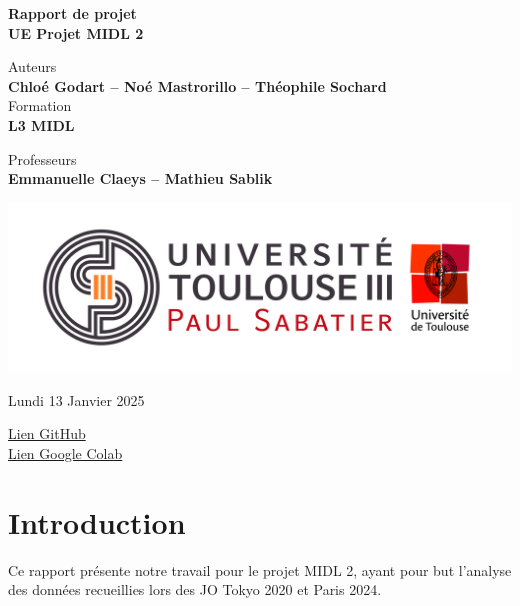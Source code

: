 \documentclass{article}
\begin{document}
\begin{titlepage}
\begin{center}

\vspace*{2cm}

\Huge \textbf{Rapport de projet}\\
\vspace{0.5cm}
\Large \textbf{UE Projet MIDL 2}\\

\vspace{1cm}

\large Auteurs \\ \textbf{Chloé Godart -- Noé Mastrorillo -- Théophile Sochard}\\
\vspace{0.5cm}
Formation \\ \textbf{L3 MIDL}


\vspace{1cm}


\large Professeurs \\ \textbf{Emmanuelle Claeys -- Mathieu Sablik}

\vspace{1cm}

\includegraphics[width=0.5\linewidth]{assets/Logo_UT3.jpg}


\vspace{1cm}

Lundi 13 Janvier 2025

\vspace{1cm}

\href{https://github.com/theosoch/projet-midl-2.git}{Lien GitHub}
 \\
\href{https://colab.research.google.com/drive/1JksiwP0xOu8adagP3vgTN8qdQLHjGTxZ?usp=drive_link}{Lien Google Colab}


\end{center}
\end{titlepage}

\newpage
\tableofcontents
\newpage
\section{Introduction}
Ce rapport présente notre travail pour le projet MIDL 2, ayant pour but l'analyse des données recueillies lors des JO Tokyo 2020 et Paris 2024. 
\\
\end{document}

